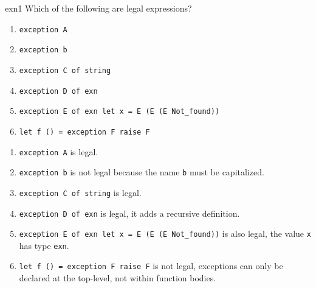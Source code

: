 %
%
%
\exercises

%
\begin{exercise}{exn1}
Which of the following are legal expressions?

\begin{enumerate}
\item \lstinline+exception A+
\item \lstinline+exception b+
\item \lstinline+exception C of string+
\item \lstinline+exception D of exn+
\item \lstinline+exception E of exn let x = E (E (E Not_found))+
\item \lstinline+let f () = exception F raise F+
\end{enumerate}

\begin{answer}\ifanswers
\begin{enumerate}
\item \lstinline+exception A+ is legal.
\item \lstinline+exception b+ is not legal because the name \lstinline+b+ must be capitalized.
\item \lstinline+exception C of string+ is legal.
\item \lstinline+exception D of exn+ is legal, it adds a recursive definition.
\item \lstinline+exception E of exn let x = E (E (E Not_found))+ is also legal, the value \lstinline+x+ has type \lstinline+exn+.
\item \lstinline+let f () = exception F raise F+ is not legal, exceptions can only be declared at the top-level, not
within function bodies.
\end{enumerate}
\fi\end{answer}
\end{exercise}

